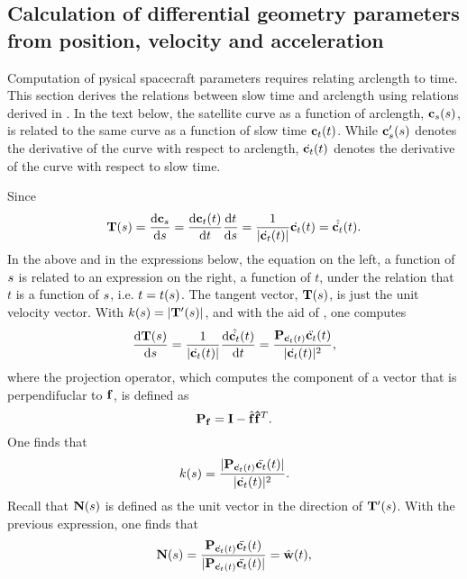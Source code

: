 \subsection{Calculation of differential geometry parameters from position, velocity and acceleration}
\label{sc:arcslow}
Computation of pysical spacecraft parameters requires relating arclength to time. This section derives the relations between slow time and arclength using relations derived in . In the text below, the satellite curve as a function of arclength, $\mathbf{c}_s(s)$, is related to the same curve as a function of slow time $\mathbf{c}_t(t)$. While $\mathbf{c}_s'(s)$ denotes the derivative of the curve with respect to arclength, $\dot{\mathbf{c}_t}(t)$ denotes the derivative of the curve with respect to slow time.
\par
Since
\begin{equation}
\mathbf{T}(s) = \frac{\text{d}{\ensuremath{\mathbf{c}_s}}}{\text{d}{\ensuremath{s}}} = \frac{\text{d}{\ensuremath{\mathbf{c}_t}(t)}}{\text{d}{t}}\frac{\text{d}{t}}{\text{d}{\ensuremath{s}}} = \frac{1}{\lvert\dot{\mathbf{c}_t}(t)\rvert}\dot{\mathbf{c}_t}(t) = \hat{\dot{\mathbf{c}_t}}(t).
\end{equation}
In the above and in the expressions below, the equation on the left, a function of $s$ is related to an expression on the right, a function of $t$, under the relation that $t$ is a function of $s$, i.e. $t = t(s)$.
The tangent vector, $\mathbf{T}(s)$, is just the unit velocity vector. With $k(s) = \lvert \mathbf{T}'(s)\rvert$, and with the aid of , one computes
\begin{equation}
 \frac{\d{\vct{T}(\parm)}}{\d{\parm}} = \frac{1}{\lvert\dx(t)\rvert}\frac{\d{\hat\dx(t)}}{\d{t}} = \frac{\mtx{P}_{\dx(t)}\ddx(t)}{\lvert\dx(t)\rvert^2},
\end{equation}
where the projection operator, which computes the component of a vector that is perpendifuclar to $\mathbf{f}$, is defined as
\begin{equation}
 \mtx{P}_\vct{f} = \mtx{I} - \hat{\vct{f}}\vct{\hat{f}}^T.
\end{equation}
One finds that
\begin{equation}
 k(\parm) = \frac{\lvert\mtx{P}_{\dx(t)}\ddx(t)\rvert}{\lvert\dx(t)\rvert^2}.
\end{equation}
Recall that $\mathbf{N}(s)$ is defined as the unit vector in the direction of $\mathbf{T}'(s)$. With the previous expression, one finds that
\begin{equation}
 \vct{N}(\parm) = \frac{\mtx{P}_{\dx(t)}\ddx(t)}{\lvert\mtx{P}_{\dx(t)}\ddx(t)\rvert} = \hat{\vct{w}}(t),
\end{equation}
